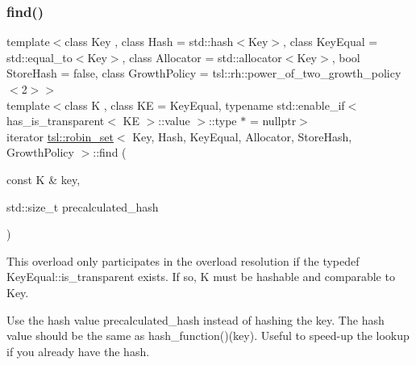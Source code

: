 \subsubsection{\texorpdfstring{find()}{find()}\hspace{0.1cm}{\footnotesize\ttfamily [4/6]}}
{\footnotesize\ttfamily template$<$class Key , class Hash  = std\+::hash$<$\+Key$>$, class Key\+Equal  = std\+::equal\+\_\+to$<$\+Key$>$, class Allocator  = std\+::allocator$<$\+Key$>$, bool Store\+Hash = false, class Growth\+Policy  = tsl\+::rh\+::power\+\_\+of\+\_\+two\+\_\+growth\+\_\+policy$<$2$>$$>$ \\
template$<$class K , class KE  = Key\+Equal, typename std\+::enable\+\_\+if$<$ has\+\_\+is\+\_\+transparent$<$ K\+E $>$\+::value $>$\+::type $\ast$  = nullptr$>$ \\
iterator \mbox{\hyperlink{classtsl_1_1robin__set}{tsl\+::robin\+\_\+set}}$<$ Key, Hash, Key\+Equal, Allocator, Store\+Hash, Growth\+Policy $>$\+::find (\begin{DoxyParamCaption}\item[{const K \&}]{key,  }\item[{std\+::size\+\_\+t}]{precalculated\+\_\+hash }\end{DoxyParamCaption})\hspace{0.3cm}{\ttfamily [inline]}}





This overload only participates in the overload resolution if the typedef Key\+Equal\+::is\+\_\+transparent exists. If so, K must be hashable and comparable to Key.

Use the hash value \textquotesingle{}precalculated\+\_\+hash\textquotesingle{} instead of hashing the key. The hash value should be the same as hash\+\_\+function()(key). Useful to speed-\/up the lookup if you already have the hash. \mbox{\label{classtsl_1_1robin__set_a19a90ecba2c0ff2505960501375931ea}} 
